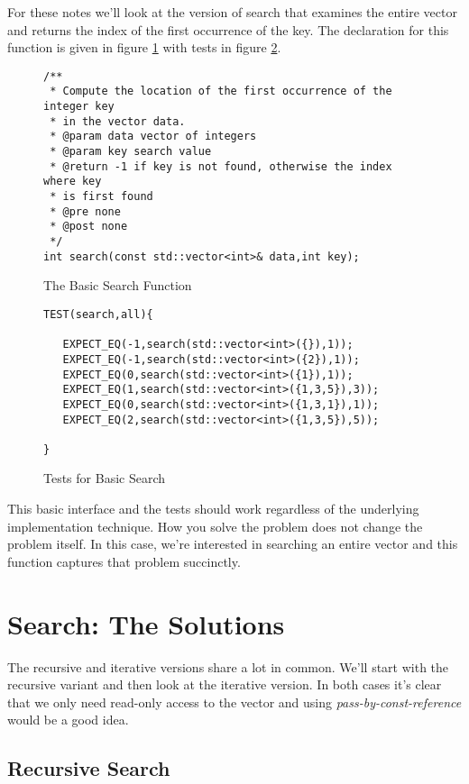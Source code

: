 \documentclass[]{tufte-handout}
\begin{document}
For these notes we'll look at the version of search that examines the entire vector and returns the index of the first occurrence 
of the key. The declaration for this function is given in figure \ref{code:searchdecl} with tests in figure \ref{code:searchtests}.

\begin{figure}[!htpb]
\begin{lstlisting}
/**
 * Compute the location of the first occurrence of the integer key
 * in the vector data.
 * @param data vector of integers
 * @param key search value
 * @return -1 if key is not found, otherwise the index where key
 * is first found
 * @pre none
 * @post none
 */
int search(const std::vector<int>& data,int key);
\end{lstlisting}
\label{code:searchdecl}
\caption{The Basic Search Function}
\end{figure}

\begin{figure}[htpb!]
\begin{lstlisting}
TEST(search,all){

   EXPECT_EQ(-1,search(std::vector<int>({}),1));
   EXPECT_EQ(-1,search(std::vector<int>({2}),1));
   EXPECT_EQ(0,search(std::vector<int>({1}),1));
   EXPECT_EQ(1,search(std::vector<int>({1,3,5}),3));
   EXPECT_EQ(0,search(std::vector<int>({1,3,1}),1));
   EXPECT_EQ(2,search(std::vector<int>({1,3,5}),5));

}
\end{lstlisting}
\label{code:searchtests}
\caption{Tests for Basic Search}
\end{figure}

This basic interface and the tests should work regardless of the underlying implementation technique.  How you solve the problem does not change the problem itself.  In this case, we're interested in searching an entire vector and this function captures that problem succinctly.   

\section{Search: The Solutions}

The recursive and iterative versions share a lot in common. We'll start with the recursive variant and then look at the iterative version. In both cases it's clear that we only need read-only access to the vector and using \textit{pass-by-const-reference} would be a good idea.

\subsection{Recursive Search}
\end{document}
